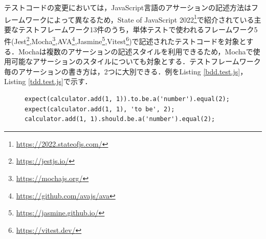 \documentclass[submit]{ipsj}
\begin{document}
{%

テストコードの変更においては，JavaScript言語のアサーションの記述方法はフレームワークによって異なるため，State of JavaScript 2022\footnote{\url{https://2022.stateofjs.com/}}で紹介されている主要なテストフレームワーク13件のうち，単体テストで使われるフレームワーク5件(Jest\footnote{\url{https://jestjs.io/}},Mocha\footnote{\url{https://mochajs.org/}},AVA\footnote{\url{https://github.com/avajs/ava}},Jasmine\footnote{\url{https://jasmine.github.io/}},Vitest\footnote{\url{https://vitest.dev/}})で記述されたテストコードを対象とする．Mochaは複数のアサーションの記述スタイルを利用できるため，Mochaで使用可能なアサーションのスタイルについても対象とする．テストフレームワーク毎のアサーションの書き方は，2つに大別できる．例をListing \ref{bdd.test.js}，Listing \ref{tdd.test.js}で示す．


\begin{figure}[t]
\begin{lstlisting}[caption=アサーション例1, label=bdd.test.js]
expect(calculator.add(1, 1)).to.be.a('number').equal(2);
expect(calculator.add(1, 1), 'to be', 2);
calculator.add(1, 1).should.be.a('number').equal(2);
\end{lstlisting}


\end{figure}}
\end{document}
